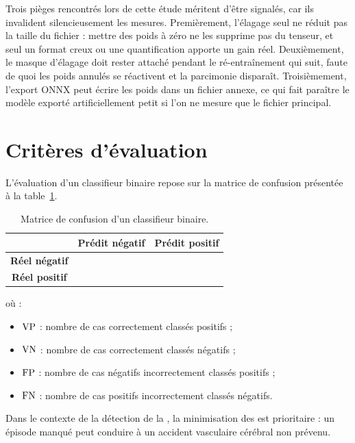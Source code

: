 Trois pièges rencontrés lors de cette étude méritent d'être signalés, car ils invalident silencieusement les mesures. Premièrement, l'élagage seul ne réduit pas la taille du fichier : mettre des poids à zéro ne les supprime pas du tenseur, et seul un format creux ou une quantification apporte un gain réel. Deuxièmement, le masque d'élagage doit rester attaché pendant le ré-entraînement qui suit, faute de quoi les poids annulés se réactivent et la parcimonie disparaît. Troisièmement, l'export ONNX peut écrire les poids dans un fichier annexe, ce qui fait paraître le modèle exporté artificiellement petit si l'on ne mesure que le fichier principal.

\section{Critères d'évaluation}
\label{sec:meth:criteres}

L'évaluation d'un classifieur binaire repose sur la matrice de confusion présentée à la table~\ref{tab:meth:confusion}.

\begin{table}[H]
  \centering
  \caption{Matrice de confusion d'un classifieur binaire.}
  \label{tab:meth:confusion}
  \begin{tabular}{c|cc}
    \toprule
     & \textbf{Prédit négatif} & \textbf{Prédit positif} \\
    \midrule
    \textbf{Réel négatif} & \VN{} & \FP{} \\
    \textbf{Réel positif} & \FN{} & \VP{} \\
    \bottomrule
  \end{tabular}
\end{table}

\noindent où :
\begin{itemize}[leftmargin=*]
  \item \(\mathrm{VP}{}\) : nombre de cas correctement classés positifs ;
  \item \(\mathrm{VN}{}\) : nombre de cas correctement classés négatifs ;
  \item \(\mathrm{FP}{}\) : nombre de cas négatifs incorrectement classés positifs ;
  \item \(\mathrm{FN}{}\) : nombre de cas positifs incorrectement classés négatifs.
\end{itemize}

Dans le contexte de la détection de la \FA{}, la minimisation des \FN{} est prioritaire : un épisode manqué peut conduire à un accident vasculaire cérébral non prévenu.

